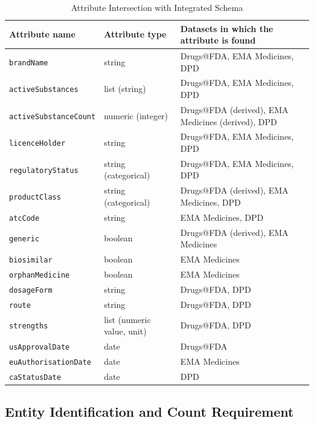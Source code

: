 \documentclass[a4paper,oneside,bibliography=totoc]{scrbook}
\begin{document}
\begin{table}[htbp]
\centering
\caption{Attribute Intersection with Integrated Schema}
\label{tab:schema}
\scriptsize
\begin{tabular}{|l|l|>{\raggedright\arraybackslash}p{5.5cm}|}
\hline
\textbf{Attribute name} & \textbf{Attribute type} & \textbf{Datasets in which the attribute is found} \\
\hline
\texttt{brandName} & string & Drugs@FDA, EMA Medicines, DPD \\
\texttt{activeSubstances} & list (string) & Drugs@FDA, EMA Medicines, DPD \\
\texttt{activeSubstanceCount} & numeric (integer) & Drugs@FDA (derived), EMA Medicines (derived), DPD \\
\texttt{licenceHolder} & string & Drugs@FDA, EMA Medicines, DPD \\
\texttt{regulatoryStatus} & string (categorical) & Drugs@FDA, EMA Medicines, DPD \\
\texttt{productClass} & string (categorical) & Drugs@FDA (derived), EMA Medicines, DPD \\
\texttt{atcCode} & string & EMA Medicines, DPD \\
\texttt{generic} & boolean & Drugs@FDA (derived), EMA Medicines \\
\texttt{biosimilar} & boolean & EMA Medicines \\
\texttt{orphanMedicine} & boolean & EMA Medicines \\
\texttt{dosageForm} & string & Drugs@FDA, DPD \\
\texttt{route} & string & Drugs@FDA, DPD \\
\texttt{strengths} & list (numeric value, unit) & Drugs@FDA, DPD \\
\texttt{usApprovalDate} & date & Drugs@FDA \\
\texttt{euAuthorisationDate} & date & EMA Medicines \\
\texttt{caStatusDate} & date & DPD \\
\hline
\end{tabular}
\end{table}

\subsection{Entity Identification and Count Requirement}
\end{document}
